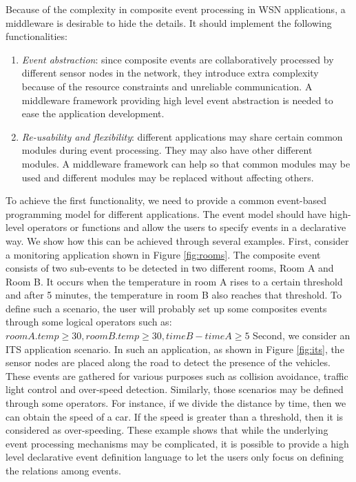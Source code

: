 Because of the complexity in composite event processing in WSN applications, a middleware is desirable to hide the details. It should implement the following functionalities:
\begin{enumerate}
\item \emph{Event abstraction}: since composite events are collaboratively processed by different sensor nodes in the network, they introduce extra complexity because of the resource constraints and unreliable communication. A middleware framework providing high level event abstraction is needed to ease the application development.
\item \emph{Re-usability and flexibility}: different applications may share certain common modules during event processing. They may also have other different modules. A middleware framework can help so that common modules may be used and different modules may be replaced without affecting others.
\end{enumerate}

To achieve the first functionality, we need to provide a common event-based programming model for different applications. The event model should have high-level operators or functions and allow the users to specify events in a declarative way. We show how this can be achieved through several examples. First, consider a monitoring application shown in Figure \ref{fig:rooms}. The composite event consists of two sub-events to be detected in two different rooms, Room A and Room B. It occurs when the temperature in room A rises to a certain threshold and after 5 minutes, the temperature in room B also reaches that threshold. To define such a scenario, the user will probably set up some composites events through some logical operators such as: \(roomA.temp \geq 30, roomB.temp \geq 30, timeB - timeA \geq 5\) Second, we consider an ITS application scenario. In such an application, as shown in Figure \ref{fig:its}, the sensor nodes are placed along the road to detect the presence of the vehicles. These events are gathered for various purposes such as collision avoidance, traffic light control and over-speed detection. Similarly, those scenarios may be defined through some operators. For instance, if we divide the distance by time, then we can obtain the speed of a car. If the speed is greater than a threshold, then it is considered as over-speeding. These example shows that while the underlying event processing mechanisms may be complicated, it is possible to provide a high level declarative event definition language to let the users only focus on defining the relations among events.

